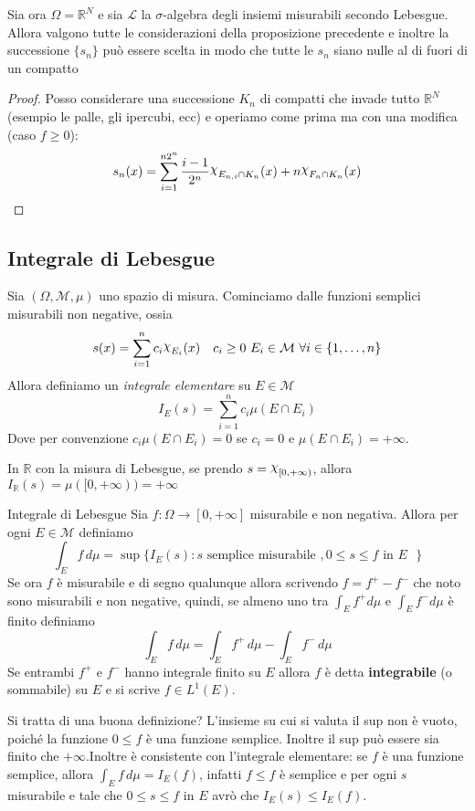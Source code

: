 \begin{lemmao}\label{le:nulle_fuori_compatti}
Sia ora \(\Omega = \mathbb{R}^{N}\) e sia \(\mathcal{L}\) la \(\sigma\)-algebra
degli insiemi misurabili secondo Lebesgue. Allora valgono tutte le
considerazioni della proposizione precedente e inoltre la successione
\(\{s_{n}\} \) può essere scelta in modo che tutte le \(s_{n}\) siano nulle al
di fuori di un compatto 
\end{lemmao}
\begin{proof}
    Posso considerare una successione \(K_{n}\) di compatti che invade tutto
    \(\mathbb{R}^{N}\) (esempio le palle, gli ipercubi, ecc) e operiamo come
    prima ma con una modifica (caso \(f \ge 0\)):
    \[
        s_{n}(x) = \sum_{i=1}^{n{2}^{n}} \frac{i-1}{2^{n}} \rchi_{E_{n, i} \cap
        K_{n}}(x) +
        n \rchi_{F_{n} \cap K_{n}}(x)
    \]
\end{proof}

\subsection{Integrale di Lebesgue}
Sia \((\Omega, \mathcal{M}, \mu)\) uno spazio di misura. Cominciamo dalle
funzioni semplici misurabili non negative, ossia
\[
    s(x) = \sum_{i=1}^{n} c_{i} \rchi_{E_{i}}(x) \quad c_{i} \ge 0 \,\,
    E_{i} \in \mathcal{M} \,\, \forall i \in \{1, \dots, n\}
\]
Allora definiamo un \emph{integrale elementare} su \(E \in \mathcal{M}\) 
\[
    I_E(s) = \sum_{i=1}^{n} c_{i} \mu(E \cap E_{i})
\]
Dove per convenzione \(c_{i}\mu(E \cap E_{i}) = 0\) se \(c_{i} = 0\) e \(\mu(E
\cap E_{i}) = +\infty\). 
\begin{example}
    In \(\mathbb{R}\) con la misura di Lebesgue, se prendo \(s = \rchi_{[0,
    +\infty)}\), allora \(I_{\mathbb{R}}(s) = \mu([0, +\infty)) = +\infty \) 
\end{example}
\begin{definition}{Integrale di Lebesgue}
    Sia \(f: \Omega \to [0, +\infty]\) misurabile e non negativa. Allora per
    ogni \(E \in \mathcal{M}\) definiamo 
    \[
        \int_E f \, d\mu = \sup \{I_{E}(s) : s \text{ semplice misurabile }, 0 \le s \le f
        \text{ in \(E\) }\}
    \]
Se ora \(f\) è misurabile e di segno qualunque allora scrivendo \(f = f^{+} -
f^{-}\) che noto sono misurabili e non negative, quindi, se almeno uno tra
\(\int_E f^{+} d\mu\) e \(\int_E f^{-} d\mu\) è finito definiamo
\[
    \int_{E} f \, d\mu = \int_{E} f^{+} \, d\mu - \int_{E} f^{-} \, d\mu
\]
Se entrambi \(f^{+}\) e \(f^{-}\) hanno integrale finito su \(E\) allora \(f\) 
è detta \textbf{integrabile} (o sommabile) su \(E\) e si scrive \(f \in L^{1}(E)\). 
\end{definition}
Si tratta di una buona definizione? L'insieme su cui si valuta il sup non è vuoto, poiché la funzione \(0 \le f\) è una funzione
semplice. Inoltre il sup può essere sia finito che \(+\infty\).Inoltre è consistente con l'integrale elementare: se \(f\) è una
funzione semplice, allora \(\int_{E} f \, d\mu = I_{E}(f)\), infatti \(f \le f\)
è semplice e per ogni \(s\) misurabile e tale che \(0 \le s\le f\) in \(E\) avrò
che \(I_E(s) \le I_E(f)\).

